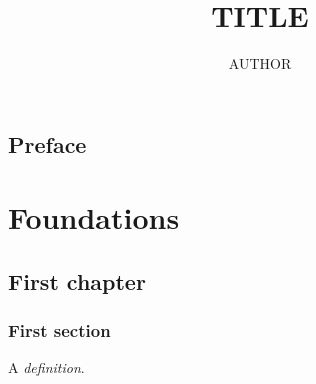 \documentclass[11pt]{amsbook}
\theoremstyle{plain}
\theoremstyle{definition}
\theoremstyle{remark}
\begin{document}
\frontmatter
\title{{{TITLE}}}
\author{{{AUTHOR}}}
\maketitle
\tableofcontents
\chapter*{Preface}
\mainmatter
\part{Foundations}
\chapter{First chapter}
\section{First section}
A \emph{definition}.
\backmatter


\printindex
\end{document}
